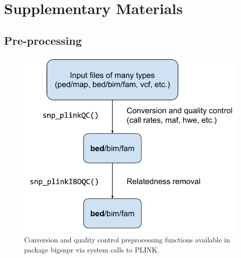 \documentclass[a4paper, 11pt]{article}
\begin{document}
\section{Supplementary Materials}

\renewcommand{\thefigure}{S\arabic{figure}}
\setcounter{figure}{0}
\renewcommand{\thetable}{S\arabic{table}}
\setcounter{table}{0}

\subsection{Pre-processing}

\begin{figure}[!h]
\centerline{\includegraphics[width=\linewidth]{conversion-QC.pdf}}
\caption{Conversion and quality control preprocessing functions available in package bigsnpr via system calls to PLINK.}\label{fig:qc}
\end{figure}

\clearpage
\end{document}
